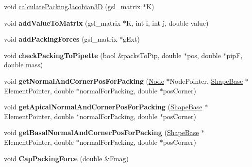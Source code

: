 \begin{DoxyCompactItemize}
\item 
void \hyperlink{classSimulation_a07d76a2495e1b863ab0cdb7185821bec}{calculate\+Packing\+Jacobian3\+D} (gsl\+\_\+matrix $\ast$K)
\item 
\hypertarget{classSimulation_ac096cfe7f8b3b7b66f6af2a87ff6556f}{}void {\bfseries add\+Value\+To\+Matrix} (gsl\+\_\+matrix $\ast$K, int i, int j, double value)\label{classSimulation_ac096cfe7f8b3b7b66f6af2a87ff6556f}

\item 
\hypertarget{classSimulation_a7a62be5131e130aa7f631201d5a4a49a}{}void {\bfseries add\+Packing\+Forces} (gsl\+\_\+matrix $\ast$g\+Ext)\label{classSimulation_a7a62be5131e130aa7f631201d5a4a49a}

\item 
\hypertarget{classSimulation_aa04a4380d3de7ffd60791cac5c1ea0ac}{}void {\bfseries check\+Packing\+To\+Pipette} (bool \&packs\+To\+Pip, double $\ast$pos, double $\ast$pip\+F, double mass)\label{classSimulation_aa04a4380d3de7ffd60791cac5c1ea0ac}

\item 
\hypertarget{classSimulation_a004805b638cbb25dee920e8883dca667}{}void {\bfseries get\+Normal\+And\+Corner\+Pos\+For\+Packing} (\hyperlink{classNode}{Node} $\ast$Node\+Pointer, \hyperlink{classShapeBase}{Shape\+Base} $\ast$Element\+Pointer, double $\ast$normal\+For\+Packing, double $\ast$pos\+Corner)\label{classSimulation_a004805b638cbb25dee920e8883dca667}

\item 
\hypertarget{classSimulation_a532ee0b0d6b016b898391fc7188187cc}{}void {\bfseries get\+Apical\+Normal\+And\+Corner\+Pos\+For\+Packing} (\hyperlink{classShapeBase}{Shape\+Base} $\ast$Element\+Pointer, double $\ast$normal\+For\+Packing, double $\ast$pos\+Corner)\label{classSimulation_a532ee0b0d6b016b898391fc7188187cc}

\item 
\hypertarget{classSimulation_a80ed7a37c28be0fd5bdbd097e4b44344}{}void {\bfseries get\+Basal\+Normal\+And\+Corner\+Pos\+For\+Packing} (\hyperlink{classShapeBase}{Shape\+Base} $\ast$Element\+Pointer, double $\ast$normal\+For\+Packing, double $\ast$pos\+Corner)\label{classSimulation_a80ed7a37c28be0fd5bdbd097e4b44344}

\item 
\hypertarget{classSimulation_a33120f358a608cf6ede1a45715a8f990}{}void {\bfseries Cap\+Packing\+Force} (double \&Fmag)\label{classSimulation_a33120f358a608cf6ede1a45715a8f990}


\end{DoxyCompactItemize}
